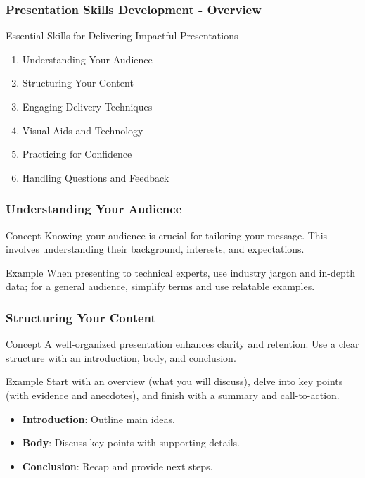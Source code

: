 \documentclass[aspectratio=169]{beamer}
\begin{document}
\begin{frame}[fragile]
    \frametitle{Presentation Skills Development - Overview}
    \begin{block}{Essential Skills for Delivering Impactful Presentations}
        \begin{enumerate}
            \item Understanding Your Audience
            \item Structuring Your Content
            \item Engaging Delivery Techniques
            \item Visual Aids and Technology
            \item Practicing for Confidence
            \item Handling Questions and Feedback
        \end{enumerate}
    \end{block}
\end{frame}

\begin{frame}[fragile]
    \frametitle{Understanding Your Audience}
    \begin{block}{Concept}
        Knowing your audience is crucial for tailoring your message. This involves understanding their background, interests, and expectations.
    \end{block}
    \begin{block}{Example}
        When presenting to technical experts, use industry jargon and in-depth data; for a general audience, simplify terms and use relatable examples.
    \end{block}
\end{frame}

\begin{frame}[fragile]
    \frametitle{Structuring Your Content}
    \begin{block}{Concept}
        A well-organized presentation enhances clarity and retention. Use a clear structure with an introduction, body, and conclusion.
    \end{block}
    \begin{block}{Example}
        Start with an overview (what you will discuss), delve into key points (with evidence and anecdotes), and finish with a summary and call-to-action.
    \end{block}
    \begin{itemize}
        \item \textbf{Introduction}: Outline main ideas.
        \item \textbf{Body}: Discuss key points with supporting details.
        \item \textbf{Conclusion}: Recap and provide next steps.
    \end{itemize}
\end{frame}
\end{document}
